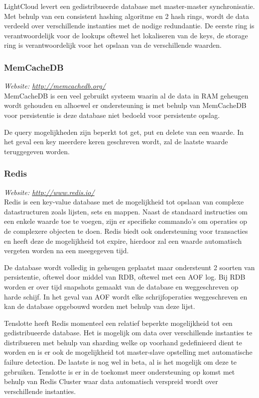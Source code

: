 LightCloud levert een gedistribueerde database met master-master synchronisatie. Met behulp van een consistent hashing algoritme en 2 hash rings, wordt de data verdeeld over verschillende instanties met de nodige redundantie. De eerste ring is verantwoordelijk voor de lookups oftewel het lokaliseren van de keys, de storage ring is verantwoordelijk voor het opslaan van de verschillende waarden. 

\subsubsection{MemCacheDB}
\textit{Website: \url{http://memcachedb.org/}}\\
MemCacheDB is een veel gebruikt systeem waarin al de data in RAM geheugen wordt gehouden en alhoewel er ondersteuning is met behulp van MemCacheDB voor persistentie is deze database niet bedoeld voor persistente opslag. 

De query mogelijkheden zijn beperkt tot get, put en delete van een waarde. In het geval een key meerdere keren geschreven wordt, zal de laatste waarde teruggegeven worden. 

\subsubsection{Redis}
\textit{Website: \url{http://www.redis.io/}}\\
Redis is een key-value database met de mogelijkheid tot opslaan van complexe datastructuren zoals lijsten, sets en mappen. Naast de standaard instructies om een enkele waarde toe te voegen, zijn er specifieke commando's om operaties op de complexere objecten te doen. Redis biedt ook ondersteuning voor transacties en heeft deze de mogelijkheid tot expire, hierdoor zal een waarde automatisch vergeten worden na een meegegeven tijd. 

De database wordt volledig in geheugen geplaatst maar ondersteunt 2 soorten van persistentie, oftewel door middel van RDB, oftewel met een AOF log. Bij RDB worden er over tijd snapshots gemaakt van de database en weggeschreven op harde schijf. In het geval van AOF wordt elke schrijfoperaties weggeschreven en kan de database opgebouwd worden met behulp van deze lijst.

Tenslotte heeft Redis momenteel een relatief beperkte mogelijkheid tot een gedistribueerde database. Het is mogelijk om data over verschillende instanties te distribueren met behulp van sharding welke op voorhand gedefinieerd dient te worden en is er ook de mogelijkheid tot master-slave opstelling met automatische failure detection.
De laatste is nog wel in beta, al is het mogelijk om deze te gebruiken. Tenslotte is er in de toekomst meer ondersteuning op komst met behulp van Redis Cluster waar data automatisch verspreid wordt over verschillende instanties. 

